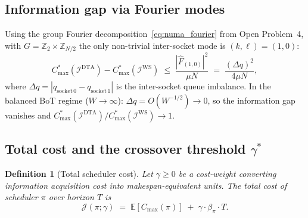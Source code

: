 \documentclass[11pt,a4paper]{article}
\newtheorem{definition}{Definition}[section]
\begin{document}
\subsection{Information gap via Fourier modes}

Using the group Fourier decomposition~\eqref{eq:numa_fourier}
from Open Problem~4, with $G = \mathbb{Z}_2 \times \mathbb{Z}_{N/2}$
the only non-trivial inter-socket mode is $(k,\ell) = (1,0)$:
\begin{equation}\label{eq:info_gap_2socket}
  C_{\max}^*(\mathcal{I}^{\mathrm{DTA}}) - C_{\max}^*(\mathcal{I}^{\mathrm{WS}})
  \;\leq\;
  \frac{|\hat{F}_{(1,0)}|^2}{\mu N}
  \;=\;
  \frac{(\Delta q)^2}{4\mu N},
\end{equation}
where $\Delta q = |q_{\mathrm{socket\,0}} - q_{\mathrm{socket\,1}}|$ is the
inter-socket queue imbalance.  In the balanced BoT regime ($W \to\infty$):
$\Delta q = O(W^{-1/2}) \to 0$, so the information gap vanishes and
$C_{\max}^*(\mathcal{I}^{\mathrm{DTA}}) / C_{\max}^*(\mathcal{I}^{\mathrm{WS}}) \to 1$.

\subsection{Total cost and the crossover threshold $\gamma^*$}

\begin{definition}[Total scheduler cost]\label{def:J}
Let $\gamma \geq 0$ be a \emph{cost-weight} converting information
acquisition cost into makespan-equivalent units.  The
\emph{total cost} of scheduler $\pi$ over horizon $T$ is
\begin{equation}\label{eq:J}
  \mathcal{J}(\pi;\gamma)
  \;=\;
  \mathbb{E}[C_{\max}(\pi)]
  \;+\;
  \gamma\cdot\beta_\pi\cdot T.
\end{equation}
\end{definition}
\end{document}
